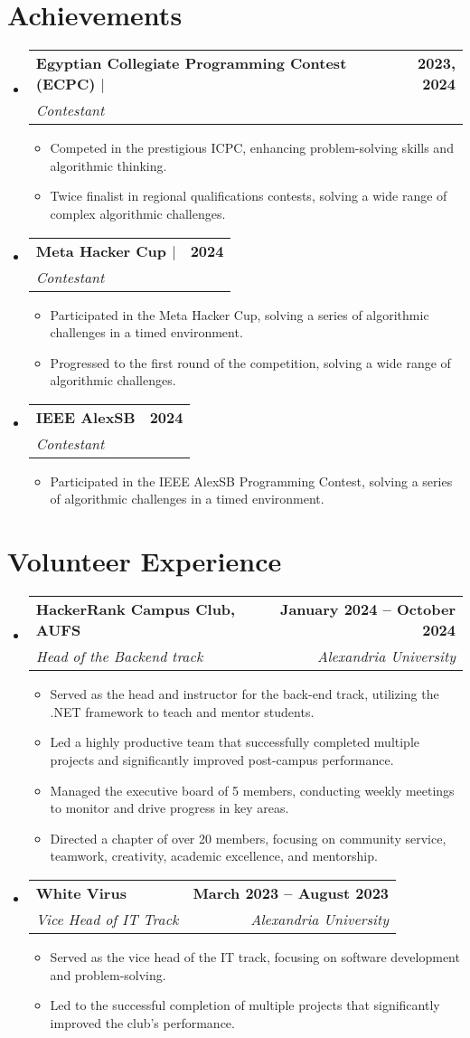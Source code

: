 \documentclass[letterpaper,11pt]{article}
\makeatletter
\newcommand{\resumeItem}[1]{
  \item\small{
    {#1 \vspace{-2pt}}
  }
}
\newcommand{\resumeSubheading}[4]{
  \vspace{-2pt}\item
    \begin{tabular*}{1.0\textwidth}[t]{l@{\extracolsep{\fill}}r}
      \textbf{#1} & \textbf{\small #2} \\
      \textit{\small#3} & \textit{\small #4} \\
    \end{tabular*}\vspace{-7pt}
}
\newcommand{\resumeSubHeadingListStart}{\begin{itemize}[leftmargin=0.0in, label={}]}
\newcommand{\resumeSubHeadingListEnd}{\end{itemize}}
\newcommand{\resumeItemListStart}{\begin{itemize}}
\newcommand{\resumeItemListEnd}{\end{itemize}\vspace{-5pt}}
\makeatother
\begin{document}
\section{Achievements}
  \resumeSubHeadingListStart
    \resumeSubheading
     {\textbf{Egyptian Collegiate Programming Contest (ECPC)} $|$ \href{https://icpc.global/ICPCID/8H1UPW16WJN6}{\faGlobe}}{2023, 2024} 
      {Contestant}{}
      \resumeItemListStart
        \resumeItem{Competed in the prestigious ICPC, enhancing problem-solving skills and algorithmic thinking.}
        \resumeItem{Twice finalist in regional qualifications contests, solving a wide range of complex algorithmic challenges.}
      \resumeItemListEnd
    \resumeSubheading
    {\textbf{Meta Hacker Cup} $|$ \href{https://www.facebook.com/codingcompetitions/hacker-cup/2024/certificate/440863471706931}{\faGlobe}}{2024}
    {Contestant}{}
    \resumeItemListStart
    \resumeItem{Participated in the Meta Hacker Cup, solving a series of algorithmic challenges in a timed environment.}
    \resumeItem{Progressed to the first round of the competition, solving a wide range of algorithmic challenges.}
    \resumeItemListEnd

    \resumeSubheading
    {IEEE AlexSB}{2024}
    {Contestant}{}
    \resumeItemListStart
    \resumeItem{Participated in the IEEE AlexSB Programming Contest, solving a series of algorithmic challenges in a timed environment.}
    \resumeItemListEnd

  \resumeSubHeadingListEnd



\section{Volunteer Experience}
  \resumeSubHeadingListStart
    \resumeSubheading
      {HackerRank Campus Club,
AUFS}{January 2024 -- October 2024}
      {Head of the Backend track}{Alexandria University}
      \resumeItemListStart
        \resumeItem{Served as the head and instructor for the back-end track, utilizing the .NET framework to teach and mentor students.}
        \resumeItem{Led a highly productive team that successfully completed multiple projects and significantly improved post-campus performance.}
        \resumeItem{Managed the executive board of 5 members, conducting weekly meetings to monitor and drive progress in key areas.}
        \resumeItem{Directed a chapter of over 20 members, focusing on community service, teamwork, creativity, academic excellence, and mentorship.}
      \resumeItemListEnd
      \resumeSubheading
      {White Virus}{March 2023 -- August 2023}
      {Vice Head of IT Track}{Alexandria University}
        \resumeItemListStart
            \resumeItem{Served as the vice head of the IT track, focusing on software development and problem-solving.}
            \resumeItem{Led to the successful completion of multiple projects that significantly improved the club's performance.}
        \resumeItemListEnd
  \resumeSubHeadingListEnd
\end{document}
